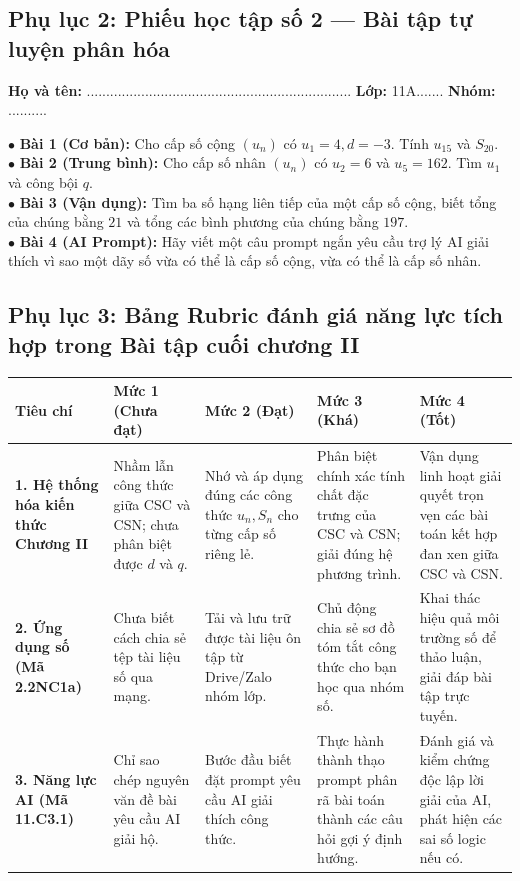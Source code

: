 \documentclass[12pt, a4paper]{article}
\begin{document}
\subsection*{Phụ lục 2: Phiếu học tập số 2 --- Bài tập tự luyện phân hóa}
\noindent\textbf{Họ và tên:} .................................................................... \textbf{Lớp:} 11A....... \textbf{Nhóm:} ..........

\begin{pedabox}
    $\bullet$ \textbf{Bài 1 (Cơ bản):} Cho cấp số cộng $(u_n)$ có $u_1 = 4, d = -3$. Tính $u_{15}$ và $S_{20}$.\\
    $\bullet$ \textbf{Bài 2 (Trung bình):} Cho cấp số nhân $(u_n)$ có $u_2 = 6$ và $u_5 = 162$. Tìm $u_1$ và công bội $q$.\\
    $\bullet$ \textbf{Bài 3 (Vận dụng):} Tìm ba số hạng liên tiếp của một cấp số cộng, biết tổng của chúng bằng $21$ và tổng các bình phương của chúng bằng $197$.\\
    $\bullet$ \textbf{Bài 4 (AI Prompt):} Hãy viết một câu prompt ngắn yêu cầu trợ lý AI giải thích vì sao một dãy số vừa có thể là cấp số cộng, vừa có thể là cấp số nhân.
\end{pedabox}

\subsection*{Phụ lục 3: Bảng Rubric đánh giá năng lực tích hợp trong Bài tập cuối chương II}

\begin{center}
\begin{tabularx}{\linewidth}{|p{3.2cm}|X|X|X|X|}
\hline
\textbf{Tiêu chí} & \textbf{Mức 1 (Chưa đạt)} & \textbf{Mức 2 (Đạt)} & \textbf{Mức 3 (Khá)} & \textbf{Mức 4 (Tốt)} \\
\hline
\textbf{1. Hệ thống hóa kiến thức Chương II} & Nhầm lẫn công thức giữa CSC và CSN; chưa phân biệt được $d$ và $q$. & Nhớ và áp dụng đúng các công thức $u_n, S_n$ cho từng cấp số riêng lẻ. & Phân biệt chính xác tính chất đặc trưng của CSC và CSN; giải đúng hệ phương trình. & Vận dụng linh hoạt giải quyết trọn vẹn các bài toán kết hợp đan xen giữa CSC và CSN. \\
\hline
\textbf{2. Ứng dụng số (Mã 2.2NC1a)} & Chưa biết cách chia sẻ tệp tài liệu số qua mạng. & Tải và lưu trữ được tài liệu ôn tập từ Drive/Zalo nhóm lớp. & Chủ động chia sẻ sơ đồ tóm tắt công thức cho bạn học qua nhóm số. & Khai thác hiệu quả môi trường số để thảo luận, giải đáp bài tập trực tuyến. \\
\hline
\textbf{3. Năng lực AI (Mã 11.C3.1)} & Chỉ sao chép nguyên văn đề bài yêu cầu AI giải hộ. & Bước đầu biết đặt prompt yêu cầu AI giải thích công thức. & Thực hành thành thạo prompt phân rã bài toán thành các câu hỏi gợi ý định hướng. & Đánh giá và kiểm chứng độc lập lời giải của AI, phát hiện các sai số logic nếu có. \\
\hline
\end{tabularx}
\end{center}
\end{document}
